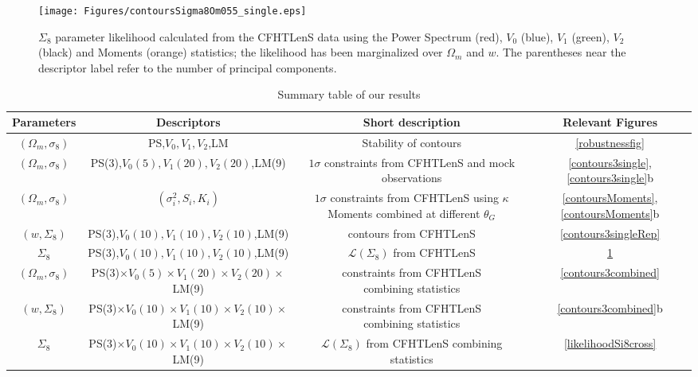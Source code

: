 \documentclass[reprint,aps,prd,superscriptaddress,showkeys,showpacs]{revtex4-1}
\begin{document}
\begin{figure}
\begin{center}
\texttt{[image: Figures/contoursSigma8Om055\_single.eps]}
\end{center}
\caption{$\Sigma_8$ parameter likelihood calculated from the CFHTLenS data using the Power Spectrum (red), $V_0$ (blue), $V_1$ (green), $V_2$ (black) and Moments (orange) statistics; the likelihood has been marginalized over $\Omega_m$ and $w$. The parentheses near the descriptor label refer to the number of principal components.}
\label{likelihoodSi8single}
\end{figure}

\begin{table*}
\begin{tabular}{c|c|c||c}
Parameters & Descriptors & Short description & Relevant Figures \\ \hline \hline
$(\Omega_m,\sigma_8)$ & PS,$V_0,V_1,V_2$,LM & Stability of contours & \ref{robustnessfig} \\ \hline 
$(\Omega_m,\sigma_8)$ & PS(3),$V_0(5),V_1(20),V_2(20)$,LM(9) &\pbox{20cm}{$1\sigma$ constraints from CFHTLenS \\ and mock observations}  & \ref{contours3single},\ref{contours3single}b \\ \hline
$(\Omega_m,\sigma_8)$ & $(\sigma_i^2,S_i,K_i)$ & \pbox{20cm}{$1\sigma$ constraints from CFHTLenS \\ using $\kappa$ Moments \\ combined at different $\theta_G$}  & \ref{contoursMoments},\ref{contoursMoments}b \\ \hline
$(w,\Sigma_8)$ & PS(3),$V_0(10),V_1(10),V_2(10)$,LM(9) & contours from CFHTLenS & \ref{contours3singleRep} \\ \hline 
$\Sigma_8$ & PS(3),$V_0(10),V_1(10),V_2(10)$,LM(9) & $\mathcal{L}(\Sigma_8)$ from CFHTLenS & \ref{likelihoodSi8single} \\ \hline
$(\Omega_m,\sigma_8)$ & PS(3)$\times V_0(5)\times V_1(20)\times V_2(20)\times$LM(9) & \pbox{20cm}{constraints from CFHTLenS \\ combining statistics} & \ref{contours3combined} \\ \hline
$(w,\Sigma_8)$ & PS(3)$\times V_0(10)\times V_1(10)\times V_2(10)\times$LM(9) & \pbox{20cm}{constraints from CFHTLenS \\ combining statistics} & \ref{contours3combined}b \\ \hline 
$\Sigma_8$ & PS(3)$\times V_0(10)\times V_1(10)\times V_2(10)\times$LM(9) & \pbox{20cm}{$\mathcal{L}(\Sigma_8)$ from CFHTLenS \\ combining statistics} & \ref{likelihoodSi8cross} \\ \hline
\end{tabular}
\caption{Summary table of our results}
\label{summarytable}
\end{table*}
%
\end{document}
